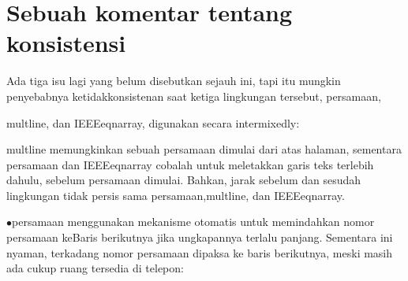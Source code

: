 \section {Sebuah komentar tentang konsistensi} 
\vspace{24pt}
\noindent 
Ada tiga isu lagi yang belum disebutkan sejauh ini, tapi itu mungkin penyebabnya ketidakkonsistenan saat ketiga lingkungan tersebut, persamaan, \par
\noindent 
multline, dan IEEEeqnarray, digunakan secara intermixedly: \par
\noindent 
 multline memungkinkan sebuah persamaan dimulai dari atas halaman, sementara persamaan dan IEEEeqnarray cobalah untuk meletakkan garis teks terlebih dahulu, sebelum persamaan dimulai. Bahkan, jarak sebelum dan sesudah lingkungan tidak persis sama persamaan,multline, dan IEEEeqnarray. \par
\noindent 
  $ \bullet $persamaan menggunakan mekanisme otomatis untuk memindahkan nomor persamaan keBaris berikutnya jika ungkapannya terlalu panjang. Sementara ini nyaman, terkadang nomor persamaan dipaksa ke baris berikutnya, meski masih ada cukup ruang tersedia di telepon: \par
